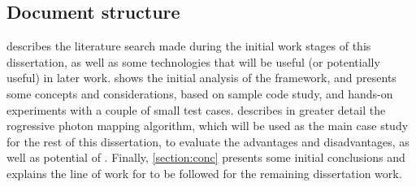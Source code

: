 \documentclass[main.tex]{subfiles}
\begin{document}
\subsection{Document structure}

 describes the literature search made during the initial work stages of this dissertation, as well as some technologies that will be useful (or potentially useful) in later work.  shows the initial analysis of the \gama framework, and presents some concepts and considerations, based on sample code study, and hands-on experiments with a couple of small test cases.  describes in greater detail the rogressive photon mapping algorithm, which will be used as the main case study for the rest of this dissertation, to evaluate the advantages and disadvantages, as well as potential of \gama. Finally, \cref{section:conc} presents some initial conclusions and explains the line of work for to be followed for the remaining dissertation work.
\end{document}
